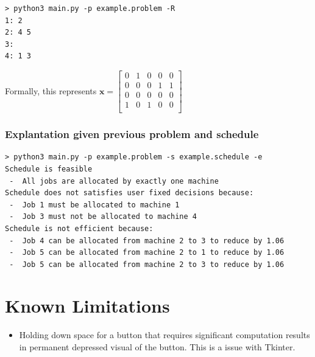 \begin{verbatim}
> python3 main.py -p example.problem -R
1: 2
2: 4 5
3: 
4: 1 3
\end{verbatim}

Formally, this represents $\mathbf{x}=\begin{bmatrix}
	0&1&0&0&0\\
	0&0&0&1&1\\
	0&0&0&0&0\\
	1&0&1&0&0\\
\end{bmatrix}$

\subsubsection{Explantation given previous problem and schedule}

\begin{verbatim}
> python3 main.py -p example.problem -s example.schedule -e
Schedule is feasible
 -  All jobs are allocated by exactly one machine
Schedule does not satisfies user fixed decisions because:
 -  Job 1 must be allocated to machine 1
 -  Job 3 must not be allocated to machine 4
Schedule is not efficient because:
 -  Job 4 can be allocated from machine 2 to 3 to reduce by 1.06
 -  Job 5 can be allocated from machine 2 to 1 to reduce by 1.06
 -  Job 5 can be allocated from machine 2 to 3 to reduce by 1.06
\end{verbatim}

\section{Known Limitations}

\begin{itemize}
	\item Holding down space for a button that requires significant computation results in permanent depressed visual of the button. This is a issue with Tkinter.
\end{itemize}